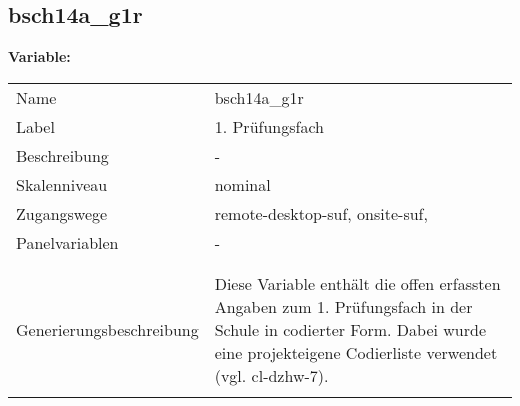 	
	
	\subsection{bsch14a\_g1r}
	\label{subSection:bsch14a_g1r}

	\noindent\textbf{Variable:}\\
		\begin{tabular}{lL{11.3cm}}
			\label{tableVariable:bsch14a_g1r}
			Name & bsch14a\_g1r \\
			Label & 1. Prüfungsfach  \\
			Beschreibung & - \\
			Skalenniveau & nominal \\
			Zugangswege &
				remote-desktop-suf,
				onsite-suf,
 \\
			Panelvariablen & -
			 \\
			 \\
 \\
					Generierungsbeschreibung & Diese Variable enthält die offen erfassten Angaben zum 1. Prüfungsfach in der Schule in codierter Form. Dabei wurde eine projekteigene Codierliste verwendet (vgl. cl-dzhw-7).
				 \\	
			 \\
		\end{tabular}






